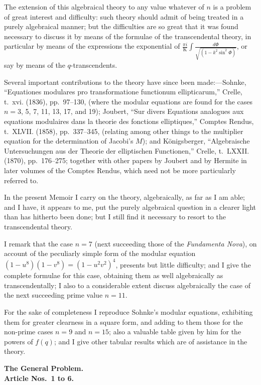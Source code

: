\documentclass[11pt,a4paper]{book}
\begin{document}
The extension of this algebraical theory to any value whatever of $n$ is a problem of great interest and difficulty: such theory should admit of being treated in a purely algebraical manner; but the difficulties are so great that it was found necessary to discuss it by means of the formulae of the transcendental theory, in particular by means of the expressions the exponential of $\frac{\pi i}{\mathrm{K}}\int\frac{d\Phi}{\sqrt{(1 - k^2\sin^2\Phi)}}$, or say by means of the $q$-transcendents.

Several important contributions to the theory have since been made:---Sohnke, ``Equationes modulares pro transformatione functionum ellipticarum,'' Crelle, t.~xvi. (1836), pp.~97--130, (where the modular equations are found for the cases $n = 3$, 5, 7, 11, 13, 17, and 19); Joubert, ``Sur divers Equations analogues aux equations modulaires dans la theorie des fonctions elliptiques,'' Comptes Rendus, t.~XLVII. (1858), pp.~337--345, (relating among other things to the multiplier equation for the determination of Jacobi's $M$); and K\"onigsberger, ``Algebraische Untersuchungen aus der Theorie der elliptischen Functionen,'' Crelle, t.~LXXII. (1870), pp.~176--275; together with other papers by Joubert and by Hermite in later volumes of the Comptes Rendus, which need not be more particularly referred to.

In the present Memoir I carry on the theory, algebraically, as far as I am able; and I have, it appears to me, put the purely algebraical question in a clearer light than has hitherto been done; but I still find it necessary to resort to the transcendental theory.

I remark that the case $n = 7$ (next succeeding those of the \textit{Fundamenta Nova}), on account of the peculiarly simple form of the modular equation $(1 - u^8)(1 - v^8) = (1 - u^2v^2)^4$, presents but little difficulty; and I give the complete formulae for this case, obtaining them as well algebraically as transcendentally; I also to a considerable extent discuss algebraically the case of the next succeeding prime value $n = 11$.

For the sake of completeness I reproduce Sohnke's modular equations, exhibiting them for greater clearness in a square form, and adding to them those for the non-prime cases $n = 9$ and $n = 15$; also a valuable table given by him for the powers of $f(q)$; and I give other tabular results which are of assistance in the theory.

\medskip
\noindent\textbf{The General Problem.}\\
\textbf{Article Nos.~1 to 6.}
\end{document}
